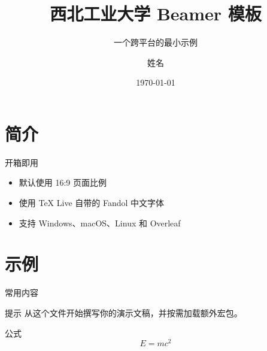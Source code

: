 \documentclass[aspectratio=169,fontset=fandol]{ctexbeamer}
\title[NWPU Beamer]{西北工业大学 Beamer 模板}
\subtitle{一个跨平台的最小示例}
\author[姓名]{姓名}
\institute[NWPU]{西北工业大学・学院名称}
\date{\today}
\begin{document}
\begin{frame}
  \titlepage
\end{frame}

\section{简介}

\begin{frame}{开箱即用}
  \begin{itemize}
    \item 默认使用 16:9 页面比例
    \item 使用 TeX Live 自带的 Fandol 中文字体
    \item 支持 Windows、macOS、Linux 和 Overleaf
  \end{itemize}
\end{frame}

\section{示例}

\begin{frame}{常用内容}
  \begin{block}{提示}
    从这个文件开始撰写你的演示文稿，并按需加载额外宏包。
  \end{block}

  \begin{exampleblock}{公式}
    \[
      E = mc^2
    \]
  \end{exampleblock}
\end{frame}



\end{document}

